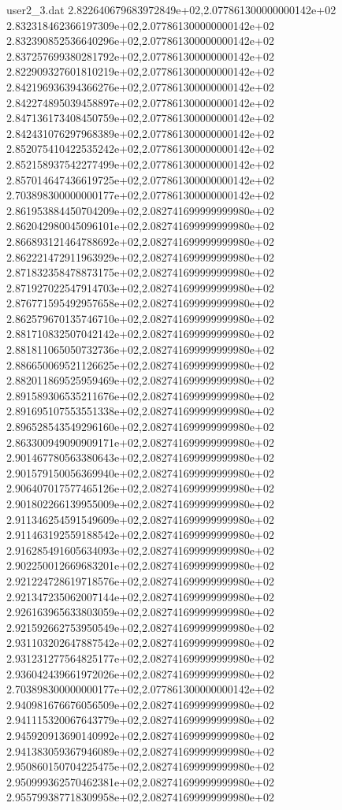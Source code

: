 \begin{filecontents}{user2_3.dat}
2.822640679683972849e+02,2.077861300000000142e+02
2.832318462366197309e+02,2.077861300000000142e+02
2.832390852536640296e+02,2.077861300000000142e+02
2.837257699380281792e+02,2.077861300000000142e+02
2.822909327601810219e+02,2.077861300000000142e+02
2.842196936394366276e+02,2.077861300000000142e+02
2.842274895039458897e+02,2.077861300000000142e+02
2.847136173408450759e+02,2.077861300000000142e+02
2.842431076297968389e+02,2.077861300000000142e+02
2.852075410422535242e+02,2.077861300000000142e+02
2.852158937542277499e+02,2.077861300000000142e+02
2.857014647436619725e+02,2.077861300000000142e+02
2.703898300000000177e+02,2.077861300000000142e+02
2.861953884450704209e+02,2.082741699999999980e+02
2.862042980045096101e+02,2.082741699999999980e+02
2.866893121464788692e+02,2.082741699999999980e+02
2.862221472911963929e+02,2.082741699999999980e+02
2.871832358478873175e+02,2.082741699999999980e+02
2.871927022547914703e+02,2.082741699999999980e+02
2.876771595492957658e+02,2.082741699999999980e+02
2.862579670135746710e+02,2.082741699999999980e+02
2.881710832507042142e+02,2.082741699999999980e+02
2.881811065050732736e+02,2.082741699999999980e+02
2.886650069521126625e+02,2.082741699999999980e+02
2.882011869525959469e+02,2.082741699999999980e+02
2.891589306535211676e+02,2.082741699999999980e+02
2.891695107553551338e+02,2.082741699999999980e+02
2.896528543549296160e+02,2.082741699999999980e+02
2.863300949090909171e+02,2.082741699999999980e+02
2.901467780563380643e+02,2.082741699999999980e+02
2.901579150056369940e+02,2.082741699999999980e+02
2.906407017577465126e+02,2.082741699999999980e+02
2.901802266139955009e+02,2.082741699999999980e+02
2.911346254591549609e+02,2.082741699999999980e+02
2.911463192559188542e+02,2.082741699999999980e+02
2.916285491605634093e+02,2.082741699999999980e+02
2.902250012669683201e+02,2.082741699999999980e+02
2.921224728619718576e+02,2.082741699999999980e+02
2.921347235062007144e+02,2.082741699999999980e+02
2.926163965633803059e+02,2.082741699999999980e+02
2.921592662753950549e+02,2.082741699999999980e+02
2.931103202647887542e+02,2.082741699999999980e+02
2.931231277564825177e+02,2.082741699999999980e+02
2.936042439661972026e+02,2.082741699999999980e+02
2.703898300000000177e+02,2.077861300000000142e+02
2.940981676676056509e+02,2.082741699999999980e+02
2.941115320067643779e+02,2.082741699999999980e+02
2.945920913690140992e+02,2.082741699999999980e+02
2.941383059367946089e+02,2.082741699999999980e+02
2.950860150704225475e+02,2.082741699999999980e+02
2.950999362570462381e+02,2.082741699999999980e+02
2.955799387718309958e+02,2.082741699999999980e+02

\end{filecontents}
